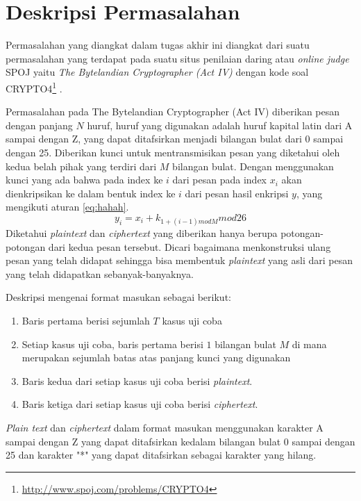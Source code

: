 	\section{Deskripsi Permasalahan}
	\label{chapter:dasar-teori}
	Permasalahan yang diangkat dalam tugas akhir ini diangkat dari suatu permasalahan yang terdapat pada suatu situs penilaian daring atau \textit{online judge} SPOJ yaitu \textit{The Bytelandian Cryptographer (Act IV)} dengan  kode soal CRYPTO4\footnote{\url{http://www.spoj.com/problems/CRYPTO4}} \cite{piwakowski_crypto4_2004}.
	
	
	 Permasalahan pada The Bytelandian Cryptographer (Act IV) diberikan pesan dengan panjang $N$ huruf, huruf yang digunakan adalah huruf kapital latin dari A sampai dengan Z, yang dapat ditafsirkan menjadi bilangan bulat dari 0 sampai dengan 25. Diberikan kunci untuk mentransmisikan pesan yang diketahui oleh kedua belah pihak yang terdiri dari $M$ bilangan bulat. Dengan menggunakan kunci yang ada bahwa pada index ke $i$ dari pesan pada index $x_i$ akan dienkripsikan ke dalam bentuk index ke $i$ dari pesan hasil enkripsi $y$, yang mengikuti aturan \ref{eq:hahah}.
	\begin{equation}
	y_i=x_i+k_{1+(i-1)mod M} mod 26 
	\label{eq:hahah}
	\end{equation}		 
	 Diketahui \textit{plaintext} dan \textit{ciphertext} yang diberikan hanya berupa potongan-potongan dari kedua pesan tersebut. Dicari bagaimana menkonstruksi ulang pesan yang telah didapat sehingga bisa membentuk \textit{plaintext} yang asli dari pesan yang telah didapatkan sebanyak-banyaknya.
	
	Deskripsi mengenai format masukan sebagai berikut:
	\begin{enumerate}
	\item Baris pertama berisi sejumlah $T$ kasus uji coba
	\item Setiap kasus uji coba, baris pertama berisi $1$ bilangan bulat $M$ di mana merupakan sejumlah batas atas panjang kunci yang digunakan 
	\item Baris kedua dari setiap kasus uji coba berisi \textit{plaintext}.
	\item Baris ketiga dari setiap kasus uji coba berisi \textit{ciphertext}.
	\end{enumerate}
	\textit{Plain text} dan \textit{ciphertext} dalam format masukan menggunakan karakter A sampai dengan Z yang dapat ditafsirkan kedalam bilangan bulat 0 sampai dengan 25 dan karakter "*" yang dapat ditafsirkan sebagai karakter yang hilang.
	
